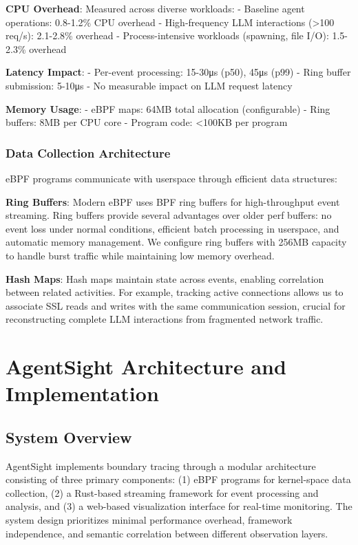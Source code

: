 \documentclass[sigplan,screen，review,9pt]{acmart}
\begin{document}
\textbf{CPU Overhead}: Measured across diverse workloads:
- Baseline agent operations: 0.8-1.2\% CPU overhead
- High-frequency LLM interactions (>100 req/s): 2.1-2.8\% overhead
- Process-intensive workloads (spawning, file I/O): 1.5-2.3\% overhead

\textbf{Latency Impact}: 
- Per-event processing: 15-30μs (p50), 45μs (p99)
- Ring buffer submission: 5-10μs
- No measurable impact on LLM request latency

\textbf{Memory Usage}:
- eBPF maps: 64MB total allocation (configurable)
- Ring buffers: 8MB per CPU core
- Program code: <100KB per program

\subsubsection{Data Collection Architecture}

eBPF programs communicate with userspace through efficient data structures:

\textbf{Ring Buffers}: Modern eBPF uses BPF ring buffers for high-throughput event streaming. Ring buffers provide several advantages over older perf buffers: no event loss under normal conditions, efficient batch processing in userspace, and automatic memory management. We configure ring buffers with 256MB capacity to handle burst traffic while maintaining low memory overhead.

\textbf{Hash Maps}: Hash maps maintain state across events, enabling correlation between related activities. For example, tracking active connections allows us to associate SSL reads and writes with the same communication session, crucial for reconstructing complete LLM interactions from fragmented network traffic.


\section{AgentSight Architecture and Implementation}

\subsection{System Overview}

AgentSight implements boundary tracing through a modular architecture consisting of three primary components: (1) eBPF programs for kernel-space data collection, (2) a Rust-based streaming framework for event processing and analysis, and (3) a web-based visualization interface for real-time monitoring. The system design prioritizes minimal performance overhead, framework independence, and semantic correlation between different observation layers.
\end{document}
